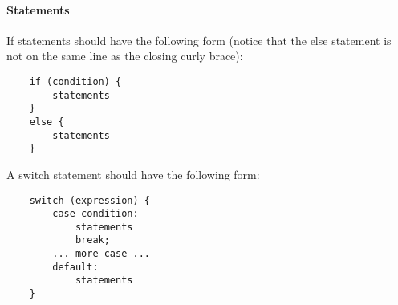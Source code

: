 \paragraph{Statements}

If statements should have the following form (notice that the else statement is
not on the same line as the closing curly brace):

\begin{lstlisting}
	if (condition) {
		statements
	}
	else {
		statements
	}
\end{lstlisting}

A switch statement should have the following form:

\begin{lstlisting}
	switch (expression) {
		case condition:
			statements
			break;
		... more case ...
		default:
			statements
	}
\end{lstlisting}
